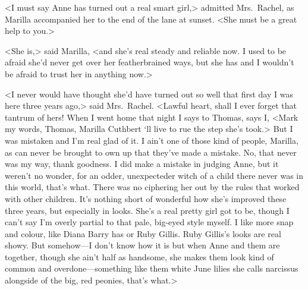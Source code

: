 <I must say Anne has turned out a real smart girl,> admitted Mrs.~Rachel, as Marilla accompanied her to the end of the lane at sunset. <She must be a great help to you.>

<She is,> said Marilla, <and she's real steady and reliable now. I used to be afraid she'd never get over her featherbrained ways, but she has and I wouldn't be afraid to trust her in anything now.>

<I never would have thought she'd have turned out so well that first day I was here three years ago,> said Mrs.~Rachel. <Lawful heart, shall I ever forget that tantrum of hers! When I went home that night I says to Thomas, says I, <Mark my words, Thomas, Marilla Cuthbert `ll live to rue the step she's took.> But I was mistaken and I'm real glad of it. I ain't one of those kind of people, Marilla, as can never be brought to own up that they've made a mistake. No, that never was my way, thank goodness. I did make a mistake in judging Anne, but it weren't no wonder, for an odder, unexpecteder witch of a child there never was in this world, that's what. There was no ciphering her out by the rules that worked with other children. It's nothing short of wonderful how she's improved these three years, but especially in looks. She's a real pretty girl got to be, though I can't say I'm overly partial to that pale, big-eyed style myself. I like more snap and colour, like Diana Barry has or Ruby Gillis. Ruby Gillis's looks are real showy. But somehow—I don't know how it is but when Anne and them are together, though she ain't half as handsome, she makes them look kind of common and overdone—something like them white June lilies she calls narcissus alongside of the big, red peonies, that's what.>